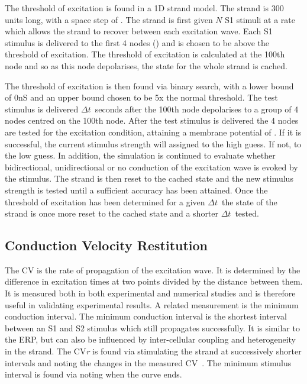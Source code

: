 The threshold of excitation is found in a 1D strand model.  The strand is 300
units long, with a space step of .  The strand is first given $N$ S1
stimuli at a rate which allows the strand to recover between each excitation
wave.  Each S1 stimulus is delivered to the first 4 nodes () and is
chosen to be above the threshold of excitation.  The threshold of excitation is
calculated at the 100th node and so as this node depolarises, the state for the
whole strand is cached.

The threshold of excitation is then found via binary search, with a lower bound
of \unit{0}{nS} and an upper bound chosen to be 5x the normal threshold.  The
test stimulus is delivered $\Delta t$\ seconds after the 100th node depolarises
to a group of 4 nodes centred on the 100th node.  After the test stimulus is
delivered the 4 nodes are tested for the excitation condition, attaining a
membrane potential of .  If it is successful, the current stimulus
strength will assigned to the high guess.  If not, to the low guess.  In
addition, the simulation is continued to evaluate whether bidirectional,
unidirectional or no conduction of the excitation wave is evoked by the
stimulus.  The strand is then reset to the cached state and the new stimulus
strength is tested until a sufficient accuracy has been attained.  Once the
threshold of excitation has been determined for a given $\Delta t$\ the state of
the strand is once more reset to the cached state and a shorter $\Delta t$\
tested.

\subsection{Conduction Velocity Restitution}

The CV is the rate of propagation of the excitation wave.
It is determined by the difference in excitation times at two points divided by
the distance between them.
It is measured both in both experimental and numerical studies and is therefore
useful in validating experimental results.
A related measurement is the minimum conduction interval.
The minimum conduction interval is the shortest interval between an S1 and S2
stimulus which still propagates successfully.
It is similar to the ERP, but can also be influenced by inter-cellular coupling
and heterogeneity in the strand.
The CV\emph{r} is found via stimulating the strand at successively shorter
intervals and noting the changes in the measured
CV~\cite{Cherry2008,Zhang2003,Qu2006}.
The minimum stimulus interval is found via noting when the curve ends.


